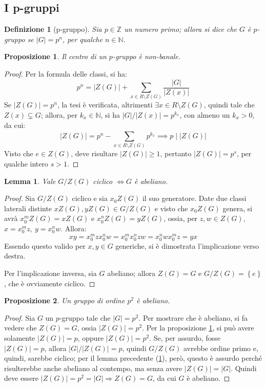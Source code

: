 \documentclass[11pt]{article}
\theoremstyle{style}
\newtheorem{definizione}{Definizione}[section]
\newtheorem{prop}{Proposizione}[section]
\newtheorem{lemma}{Lemma}[teorema]
\numberwithin{equation}{subsection}
\begin{document}
\subsection{I p-gruppi}
\begin{definizione}
	[p-gruppo]
	Sia $p \in \mathbb{Z}$ un numero primo; allora si dice che $G$ \`e $p$-gruppo se $\lvert G \rvert = p^n$, per qualche $n \in \mathbb{N}$.
\end{definizione}
\begin{prop}\label{pnb}
	Il centro di un $p$-gruppo \`e non-banale.
\end{prop} 
	\begin{proof}
		Per la formula delle classi, si ha:
		\[
		p^n = \lvert Z(G) \rvert  + \sum_{x \in R \setminus Z(G)}^{} \frac{\lvert G \rvert }{\lvert Z(x) \rvert }
		\] 
		Se $\lvert Z(G) \rvert  = p^n$, la tesi \`e verificata, altrimenti $\exists x \in R \setminus Z(G)$, quindi tale che $Z(x) \subsetneq G$; allora, per $k_x\in \mathbb{N}$, si ha $\lvert G \rvert / \lvert Z(x) \rvert = p^{k_x} $, con almeno un $k_x > 0$, da cui:
		\[
		\lvert Z(G) \rvert =p^n - \sum_{x \in R \setminus Z(G)}^{} p^{k_x} \implies p  \mid \lvert Z(G) \rvert 
		\] 
		Visto che $e \in Z(G)$, deve risultare $\lvert Z(G) \rvert \ge 1$, pertanto $\lvert Z(G) \rvert = p^s$, per qualche intero $s > 1$.
	\end{proof}
\begin{lemma}\label{GZGciffban}
	Vale $G / Z(G)$ ciclico $\iff G$ \`e abeliano.
\end{lemma}
	\begin{proof}
		Sia $G / Z(G)$ ciclico e sia $x_0 Z(G)$ il suo generatore.
		Date due classi laterali distinte $xZ(G), yZ(G) \in G / Z(G)$ e visto che $x_0Z(G)$ genera, si avr\`a $x_0^m Z(G)= x Z(G)$ e $x_0^nZ(G) = yZ(G)$, ossia, per $z,w \in Z(G)$, $x = x_0^m z,\ y = x_0^n w$. 
		Allora:
		\[
			 xy = x_0^m z x_0^n w = x_0^m x_0^n zw = x_0^n wx_0^m z = yx
		\] 
	Essendo questo valido per $x,y \in G$ generiche, si \`e dimostrata l'implicazione verso destra.

	Per l'implicazione inversa, sia $G$ abeliano; allora $Z(G) = G$ e $G / Z(G) = \left\{ e \right\} $, che \`e ovviamente ciclico.
	\end{proof}
\begin{prop}
	Un gruppo di ordine $p^2$ \`e abeliano.
\end{prop}
	\begin{proof}
		Sia $G$ un $p$-gruppo tale che $\lvert G \rvert  = p^2$. Per mostrare che \`e abeliano, si fa vedere che $Z(G) = G$, ossia $\lvert Z(G) \rvert  = p^2$.
		Per la proposizione \ref{pnb}, si pu\`o avere solamente $\lvert Z(G) \rvert = p$, oppure $\lvert Z(G) \rvert = p ^2$.
		Se, per assurdo, fosse $\lvert Z(G) \rvert =p$, allora $\lvert G \rvert / \lvert Z(G) \rvert = p$, quindi $G / Z(G)$ avrebbe ordine primo e, quindi, sarebbe ciclico; per il lemma precedente (\ref{GZGciffban}), per\`o, questo \`e assurdo perch\'e risulterebbe anche abeliano al contempo, ma senza avere $\lvert Z(G) \rvert  = \lvert G \rvert $.
		Quindi deve essere $\lvert Z(G) \rvert  = p^2 = \lvert G \rvert \Rightarrow Z(G) = G$, da cui $G$ \`e abeliano.
	\end{proof}
\end{document}
